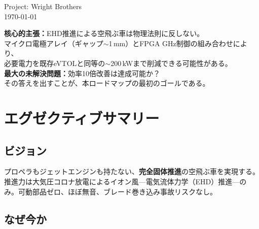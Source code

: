 \documentclass[12pt,a4paper]{ltjsarticle}
\begin{document}
\begin{titlepage}
\vspace{1.5cm}

{\large\sffamily
Project: Wright Brothers \\[4pt]
\today
}

\vspace{1cm}

\begin{tcolorbox}[colback=phase1!5, colframe=phase1!50, width=12cm]
\centering\sffamily
\textbf{核心的主張：}EHD推進による空飛ぶ車は物理法則に反しない。\\
マイクロ電極アレイ（ギャップ$\sim$1\,mm）とFPGA GHz制御の組み合わせにより、\\
必要電力を既存eVTOLと同等の$\sim$200\,kWまで削減できる可能性がある。\\[4pt]
\textbf{最大の未解決問題：}効率10倍改善は達成可能か？\\
その答えを出すことが、本ロードマップの最初のゴールである。
\end{tcolorbox}

\end{titlepage}

\tableofcontents
\newpage

\section{エグゼクティブサマリー}

\subsection{ビジョン}

プロペラもジェットエンジンも持たない、\textbf{完全固体推進}の空飛ぶ車を実現する。推進力は大気圧コロナ放電によるイオン風---電気流体力学（EHD）推進---のみ。可動部品ゼロ、ほぼ無音、ブレード巻き込み事故リスクなし。

\subsection{なぜ今か}
\end{document}
